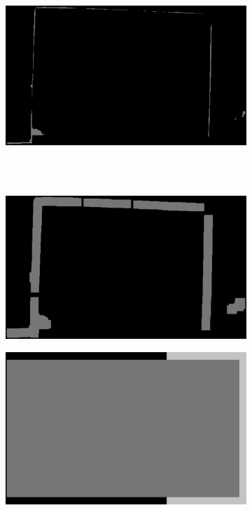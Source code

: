 \documentclass [12pt,a4paper]{report}
\begin{document}
\begin{figure}[h]
\begin{subfigure}{.5\textwidth}
	\caption{}
	\label{fig_labeling_small}
\end{subfigure}%
\begin{subfigure}{.5\textwidth}
  \centering
  \includegraphics[scale=0.27]{erosion_small.eps} %
  \caption{}
	\label{fig_erosion_small}
\end{subfigure}
\\
\\
\begin{subfigure}{.5\textwidth}
  \centering
  \includegraphics[scale=0.27]{dilatation_small.eps} %
	\caption{}
	\label{fig_dilatation_small}
\end{subfigure}%
\begin{subfigure}{.5\textwidth}
  \centering
  \includegraphics[scale=0.27]{bounding_box_small.eps} %

\end{subfigure}
\end{figure}
\end{document}
